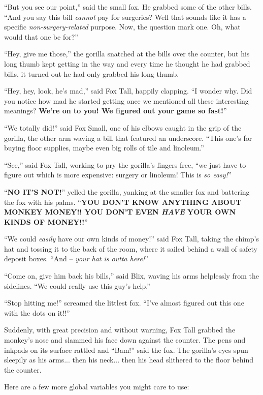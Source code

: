 \documentclass[10pt,twoside]{report}
\begin{document}
``But you see our point,'' said the small fox.  He grabbed some of the
other bills. ``And you say this bill {\em cannot} pay for surgeries?
Well that sounds like it has a specific {\em non-surgery-related}
purpose.  Now, the question mark one.  Oh, what would that one be
for?''

``Hey, give me those,'' the gorilla snatched at the bills over the
counter, but his long thumb kept getting in the way and every time he
thought he had grabbed bills, it turned out he had only grabbed his
long thumb.

``Hey, hey, look, he's mad,'' said Fox Tall, happily clapping.  ``I
wonder why.  Did you notice how mad he started getting once we
mentioned all these interesting meanings?  {\bf We're on to you!  We
  figured out your game so fast!}''

``We totally did!'' said Fox Small, one of his elbows caught in the
grip of the gorilla, the other arm waving a bill that featured an
underscore. ``This one's for buying floor supplies, maybe even big
rolls of tile and linoleum.''

``See,'' said Fox Tall, working to pry the gorilla's fingers free,
``we just have to figure out which is more expensive: surgery or
linoleum!  This is {\em so easy!}''

``{\bf NO IT'S NOT!}'' yelled the gorilla, yanking at the smaller fox
and battering the fox with his palms.  ``{\bf YOU DON'T KNOW ANYTHING
  ABOUT MONKEY MONEY!!  YOU DON'T EVEN {\em HAVE} YOUR OWN KINDS OF
  MONEY!!}''

``We could {\em easily} have our own kinds of money!'' said Fox Tall,
taking the chimp's hat and tossing it to the back of the room, where
it sailed behind a wall of safety deposit boxes.  ``And -- {\em your
  hat is outta here!}''

``Come on, give him back his bills,'' said Blix, waving his arms
helplessly from the sidelines.  ``We could really use this guy's
help.''

``Stop hitting me!'' screamed the littlest fox.  ``I've almost figured
out this one with the dots on it!!''

Suddenly, with great precision and without warning, Fox Tall grabbed
the monkey's nose and slammed his face down against the counter.  The
pens and inkpads on its surface rattled and ``Bam!'' said the fox.
The gorilla's eyes spun sleepily as his arms... then his neck... then
his head slithered to the floor behind the counter.

Here are a few more global variables you might care to use:
\end{document}
